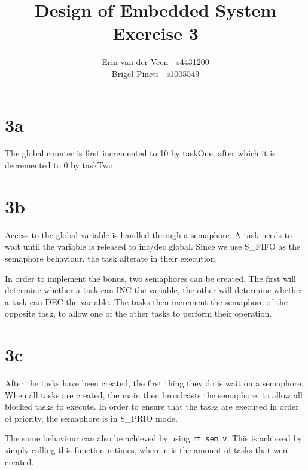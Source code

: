 \documentclass{scrartcl}
\title{Design of Embedded System\\Exercise 3}
\author{Erin van der Veen - s4431200\\
	Brigel Pineti - s1005549}
\begin{document}
\maketitle

\section*{3a}
The global counter is first incremented to 10 by taskOne, after which it is decremented to 0 by taskTwo.

\section*{3b}
Access to the global variable is handled through a semaphore.
A task needs to wait until the variable is released to inc/dec global.
Since we use S\_FIFO as the semaphore behaviour, the task alterate in their execution.

In order to implement the bonus, two semaphores can be created.
The first will determine whether a task can INC the variable, the other will determine whether a task can DEC the variable.
The tasks then increment the semaphore of the opposite task, to allow one of the other tasks to perform their operation.

\section*{3c}
After the tasks have been created, the first thing they do is wait on a semaphore.
When all tasks are created, the main then broadcasts the semaphore, to allow all blocked tasks to execute.
In order to ensure that the tasks are executed in order of priority, the semaphore is in S\_PRIO mode.

The same behaviour can also be achieved by using \lstinline|rt_sem_v|.
This is achieved by simply calling this function n times, where n is the amount of tasks that were created.
\end{document}
